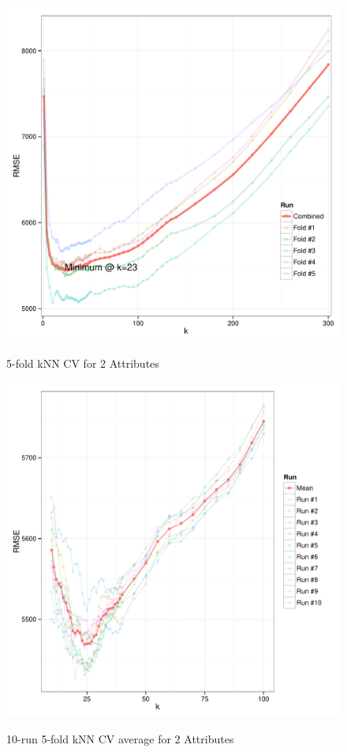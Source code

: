\documentclass[11pt, fleqn]{article}
\begin{document}
\begin{figure}[!htb]
  \centering
  \caption{5-fold kNN CV for 2 Attributes}
  \includegraphics[scale=.5]{2p_cv_k.pdf}
  \label{fig:2p_k}
\end{figure}

\begin{figure}[!htb]
  \centering
  \caption{10-run 5-fold kNN CV average for 2 Attributes}
  \includegraphics[scale=.5]{2p_cv_multi_k.pdf}
  \label{fig:2p_k_multi}
\end{figure}
\end{document}
